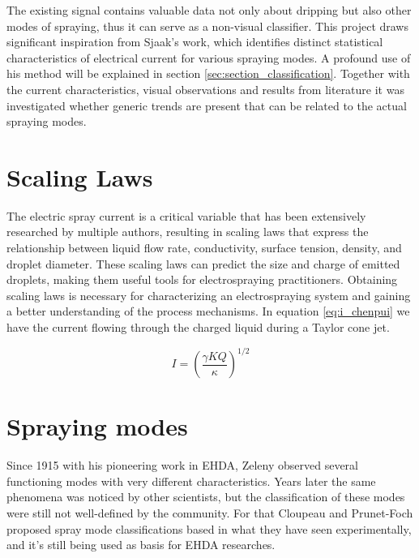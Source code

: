   The existing signal contains valuable data not only about dripping but also other modes of spraying, thus it can serve as a non-visual classifier.
  This project draws significant inspiration from Sjaak's\cite{Sjaaks} work, which identifies distinct statistical characteristics of electrical current for various spraying modes.
  A profound use of his method will be explained in section \ref{sec:section_classification}.
  Together with the current characteristics, visual observations and results from literature it was investigated whether generic trends are present that can be related to the actual spraying modes.


\section{Scaling Laws}
\label{sec:scalling-laws}

The electric spray current is a critical variable that has been extensively researched by multiple authors\cite{prunet}\cite{Chen_Pui}\cite{gananCalvo}, resulting in scaling laws that express the relationship between liquid flow rate, conductivity, surface tension, density, and droplet diameter. 
These scaling laws can predict the size and charge of emitted droplets, making them useful tools for electrospraying practitioners. 
Obtaining scaling laws is necessary for characterizing an electrospraying system and gaining a better understanding of the process mechanisms. 
In equation \ref{eq:i_chenpui} we have the current flowing through the charged liquid during a Taylor\cite{taylor} cone jet.

\begin{equation}\label{eq:i_chenpui}
	I = (\frac{\gamma K Q}{\kappa})^{1/2}
\end{equation}


\section{Spraying modes}
\label{sec:spraying_modes_subsec}

Since 1915 with his pioneering work in EHDA, Zeleny\cite{zeleny14} observed several functioning modes with very different characteristics.
Years later the same phenomena was noticed by other scientists, but the classification of these modes were still not well-defined by the community.
For that Cloupeau and Prunet-Foch\cite{prunet} proposed spray mode classifications based in what they have seen experimentally, and it's still being used as basis for EHDA researches.

